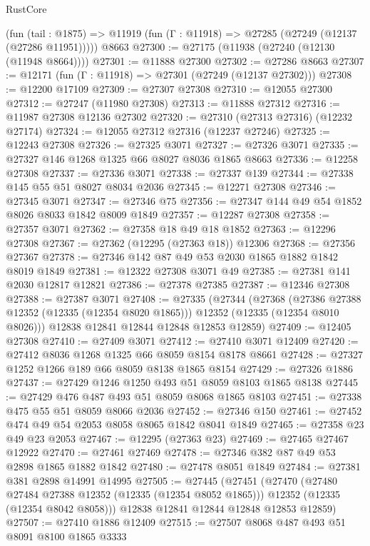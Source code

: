 \begin{lexlean}{RustCore}
\begin{coremodule}
    (fun (tail : @1875) => @11919 (fun (Γ : @11918) => @27285 (@27249 (@12137 (@27286 @11951)))))
    @8663
@27300 := @27175 (@11938 (@27240 (@12130 (@11948 @8664))))
@27301 := @11888 @27300
@27302 := @27286 @8663
@27307 := @12171 (fun (Γ : @11918) => @27301 (@27249 (@12137 @27302)))
@27308 := @12200 @17109
@27309 := @27307 @27308
@27310 := @12055 @27300
@27312 := @27247 (@11980 @27308)
@27313 := @11888 @27312
@27316 := @11987 @27308 @12136 @27302
@27320 := @27310 (@27313 @27316) (@12232 @27174)
@27324 := @12055 @27312 @27316 (@12237 @27246)
@27325 := @12243 @27308
@27326 := @27325 @3071
@27327 := @27326 @3071
@27335 := @27327 @146 @1268 @1325 @66 @8027 @8036 @1865 @8663
@27336 := @12258 @27308
@27337 := @27336 @3071
@27338 := @27337 @139
@27344 := @27338 @145 @55 @51 @8027 @8034 @2036
@27345 := @12271 @27308
@27346 := @27345 @3071
@27347 := @27346 @75
@27356 := @27347 @144 @49 @54 @1852 @8026 @8033 @1842 @8009 @1849
@27357 := @12287 @27308
@27358 := @27357 @3071
@27362 := @27358 @18 @49 @18 @1852
@27363 := @12296 @27308
@27367 := @27362 (@12295 (@27363 @18)) @12306
@27368 := @27356 @27367
@27378 := @27346 @142 @87 @49 @53 @2030 @1865 @1882 @1842 @8019 @1849
@27381 := @12322 @27308 @3071 @49
@27385 := @27381 @141 @2030 @12817 @12821
@27386 := @27378 @27385
@27387 := @12346 @27308
@27388 := @27387 @3071
@27408 := @27335
    (@27344
      (@27368
        (@27386 @27388 @12352 (@12335 (@12354 @8020 @1865)))
        @12352
        (@12335 (@12354 @8010 @8026)))
      @12838
      @12841
      @12844
      @12848
      @12853
      @12859)
@27409 := @12405 @27308
@27410 := @27409 @3071
@27412 := @27410 @3071 @12409
@27420 := @27412 @8036 @1268 @1325 @66 @8059 @8154 @8178 @8661
@27428 := @27327 @1252 @1266 @189 @66 @8059 @8138 @1865 @8154
@27429 := @27326 @1886
@27437 := @27429 @1246 @1250 @493 @51 @8059 @8103 @1865 @8138
@27445 := @27429 @476 @487 @493 @51 @8059 @8068 @1865 @8103
@27451 := @27338 @475 @55 @51 @8059 @8066 @2036
@27452 := @27346 @150
@27461 := @27452 @474 @49 @54 @2053 @8058 @8065 @1842 @8041 @1849
@27465 := @27358 @23 @49 @23 @2053
@27467 := @12295 (@27363 @23)
@27469 := @27465 @27467 @12922
@27470 := @27461 @27469
@27478 := @27346 @382 @87 @49 @53 @2898 @1865 @1882 @1842
@27480 := @27478 @8051 @1849
@27484 := @27381 @381 @2898 @14991 @14995
@27505 := @27445
    (@27451
      (@27470
        (@27480 @27484 @27388 @12352 (@12335 (@12354 @8052 @1865)))
        @12352
        (@12335 (@12354 @8042 @8058)))
      @12838
      @12841
      @12844
      @12848
      @12853
      @12859)
@27507 := @27410 @1886 @12409
@27515 := @27507 @8068 @487 @493 @51 @8091 @8100 @1865 @3333

\end{coremodule}
\end{lexlean}

